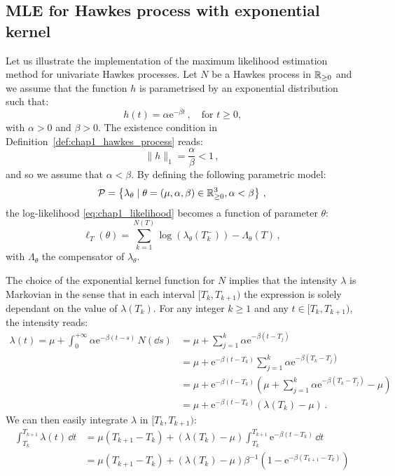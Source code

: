 \subsection{MLE for Hawkes process with exponential kernel}\label{sec:chap1_exponential_MLE}

Let us illustrate the implementation of the maximum likelihood estimation method for univariate Hawkes processes.
Let $N$ be a Hawkes process in ${\mathbb R}_{\geq 0}$ and we assume that the function $h$ is parametrised by an exponential distribution such that:
\[h(t) = \alpha\mathrm{e}^{-\beta t}\,, \quad \text{for $t\geq 0$,}\]
with $\alpha >0$ and $\beta>0$.
The existence condition in Definition~\ref{def:chap1_hawkes_process} reads:
\[\|h\|_1 = \frac{\alpha}{\beta} < 1\,,\]
and so we assume that $\alpha < \beta$. 
By defining the following parametric model:
\[\mathcal{P} = \left\{
    \lambda_\theta \mid \theta = (\mu, \alpha, \beta)\in{\mathbb R}_{\geq 0}^3, \alpha < \beta
\right\}\,,\]
the log-likelihood \eqref{eq:chap1_likelihood} becomes a function of parameter $\theta$:
\[
    \ell_T(\theta) = \sum_{k=1}^{N(T)}{\log(\lambda_\theta(T_k^-))} - \Lambda_\theta(T)\,,
\]
with $\Lambda_\theta$ the compensator of $\lambda_\theta$.

The choice of the exponential kernel function for $N$ implies that the intensity $\lambda$ is Markovian in the sense that in each interval $[T_k,T_{k+1})$ the expression is solely dependant on the value of $\lambda(T_k)$.
For any integer $k\geq 1$ and any $t\in[T_k,T_{k+1})$, the intensity reads:
\begin{align}
    \lambda(t) = \mu + \int_{0}^{+\infty}{\alpha \mathrm{e}^{-\beta(t-s)}\,N(\dd s)} &= \mu + \sum_{j=1}^{k}{\alpha \mathrm{e}^{-\beta(t-T_j)}}\nonumber\\
    &=\mu + \mathrm{e}^{-\beta(t - T_k)}\sum_{j=1}^{k}{\alpha \mathrm{e}^{-\beta(T_k-T_j)}}\nonumber\\
    &=\mu + \mathrm{e}^{-\beta(t - T_k)}\left(\mu + \sum_{j=1}^{k}{\alpha \mathrm{e}^{-\beta(T_k-T_j)}} - \mu\right)\nonumber\\
    &=\mu + \mathrm{e}^{-\beta(t - T_k)}\left(\lambda(T_k) - \mu\right)\label{eq:chap1_recursive_intensity}\,.
\end{align}
We can then easily integrate $\lambda$ in $[T_k,T_{k+1})$:
\begin{align*}
    \int_{T_k}^{T_{k+1}}{\lambda(t)\,\dd t} &= \mu(T_{k+1} - T_k) + (\lambda(T_k) - \mu) \int_{T_k}^{T_{k+1}}{\mathrm{e}^{-\beta(t - T_k)}\,\dd t}\\
    &= \mu(T_{k+1} - T_k) + (\lambda(T_k) - \mu)\beta^{-1}(1 - \mathrm{e}^{-\beta(T_{k+1} - T_k)})
\end{align*}

